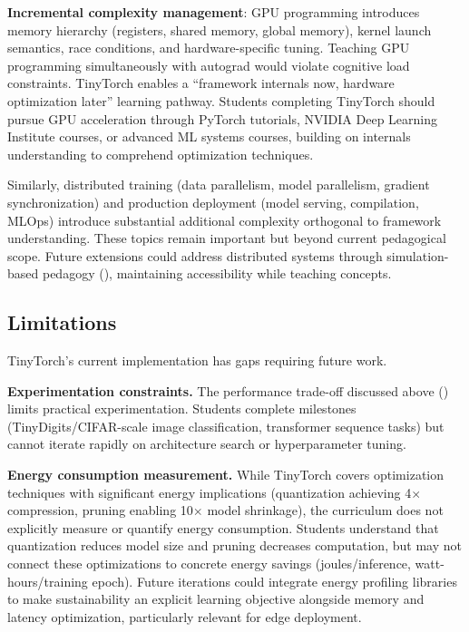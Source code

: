 \documentclass[10pt,twocolumn]{article}
\begin{document}
\textbf{Incremental complexity management}: GPU programming introduces memory hierarchy (registers, shared memory, global memory), kernel launch semantics, race conditions, and hardware-specific tuning. Teaching GPU programming simultaneously with autograd would violate cognitive load constraints. TinyTorch enables a ``framework internals now, hardware optimization later'' learning pathway. Students completing TinyTorch should pursue GPU acceleration through PyTorch tutorials, NVIDIA Deep Learning Institute courses, or advanced ML systems courses, building on internals understanding to comprehend optimization techniques.

Similarly, distributed training (data parallelism, model parallelism, gradient synchronization) and production deployment (model serving, compilation, MLOps) introduce substantial additional complexity orthogonal to framework understanding. These topics remain important but beyond current pedagogical scope. Future extensions could address distributed systems through simulation-based pedagogy (), maintaining accessibility while teaching concepts.

\subsection{Limitations}

TinyTorch's current implementation has gaps requiring future work.

\textbf{Experimentation constraints.} The performance trade-off discussed above () limits practical experimentation. Students complete milestones (TinyDigits/CIFAR-scale image classification, transformer sequence tasks) but cannot iterate rapidly on architecture search or hyperparameter tuning.

\textbf{Energy consumption measurement.} While TinyTorch covers optimization techniques with significant energy implications (quantization achieving 4$\times$ compression, pruning enabling 10$\times$ model shrinkage), the curriculum does not explicitly measure or quantify energy consumption. Students understand that quantization reduces model size and pruning decreases computation, but may not connect these optimizations to concrete energy savings (joules/inference, watt-hours/training epoch). Future iterations could integrate energy profiling libraries to make sustainability an explicit learning objective alongside memory and latency optimization, particularly relevant for edge deployment.
\end{document}
